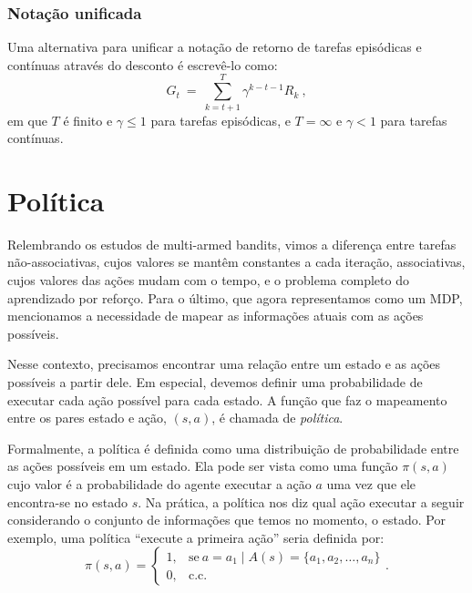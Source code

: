 \documentclass{article}
\begin{document}
            \subsubsection{Notação unificada}

                Uma alternativa para unificar a notação de retorno de tarefas episódicas e contínuas através do desconto é escrevê-lo como:
                \begin{equation}
                    G_t \ = \ \sum_{k=t+1}^{T} \gamma^{k-t-1} R_k\ ,
                \end{equation}
                em que $T$ é finito e $\gamma \leq 1$ para tarefas episódicas, e $T = \infty$ e $\gamma < 1$ para tarefas contínuas.
           
    \section{Política}
    
        Relembrando os estudos de multi-armed bandits, vimos a diferença entre tarefas não-associativas, cujos valores se mantêm constantes a cada iteração, associativas, cujos valores das ações mudam com o tempo, e o problema completo do aprendizado por reforço. Para o último, que agora representamos como um MDP, mencionamos a necessidade de mapear as informações atuais com as ações possíveis.

        Nesse contexto, precisamos encontrar uma relação entre um estado e as ações possíveis a partir dele. Em especial, devemos definir uma probabilidade de executar cada ação possível para cada estado. A função que faz o mapeamento entre os pares estado e ação, $(s, a)$, é chamada de \emph{política}. 
        
        Formalmente, a política é definida como uma distribuição de probabilidade entre as ações possíveis em um estado. Ela pode ser vista como uma função $\pi(s, a)$ cujo valor é a probabilidade do agente executar a ação $a$ uma vez que ele encontra-se no estado $s$. Na prática, a política nos diz qual ação executar a seguir considerando o conjunto de informações que temos no momento, o estado. Por exemplo, uma política ``execute a primeira ação'' seria definida por:
        \begin{equation}
            \pi(s, a) =
            \begin{cases}
                1, & \text{se}\ a = a_1 \mid A(s) = \{a_1, a_2, \dots, a_n\}\\
                0, & \text{c.c.}
            \end{cases}
            .
        \end{equation}
    
\end{document}
